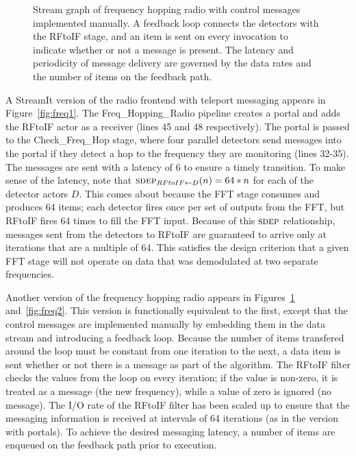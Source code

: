 \begin{figure}[t]
\vspace{-12pt}
\vspace{-20pt}
\caption{\small Stream graph of frequency hopping radio with control
messages implemented manually.  A feedback loop connects the detectors
with the RFtoIF stage, and an item is sent on every invocation to
indicate whether or not a message is present.  The latency and
periodicity of message delivery are governed by the data rates and the
number of items on the feedback
path. \protect\label{fig:fhr-manual}}
\vspace{-12pt}
\end{figure}

A StreamIt version of the radio frontend with teleport messaging
appears in Figure~\ref{fig:freq1}.  The Freq\_Hopping\_Radio pipeline
creates a portal and adds the RFtoIF actor as a receiver (lines 45 and
48 respectively).  The portal is passed to the Check\_Freq\_Hop stage,
where four parallel detectors send messages into the portal if they
detect a hop to the frequency they are monitoring (lines 32-35).  The
messages are sent with a latency of 6 to ensure a timely transition.
To make sense of the latency, note that $\sdepf{RFtoIF}{D}(n) = 64*n$
for each of the detector actors $D$.  This comes about because the FFT
stage consumes and produces 64 items; each detector fires once per set
of outputs from the FFT, but RFtoIF fires 64 times to fill the FFT
input.  Because of this $\textsc{sdep}$ relationship, messages sent from the
detectors to RFtoIF are guaranteed to arrive only at iterations that
are a multiple of 64.  This satisfies the design criterion that a
given FFT stage will not operate on data that was demodulated at two
separate frequencies.

Another version of the frequency hopping radio appears in
Figures~\ref{fig:fhr-manual} and~\ref{fig:freq2}.  This version is
functionally equivalent to the first, except that the control messages
are implemented manually by embedding them in the data stream and
introducing a feedback loop.  Because the number of items transfered
around the loop must be constant from one iteration to the next, a
data item is sent whether or not there is a message as part of the
algorithm.  The RFtoIF filter checks the values from the loop on every
iteration; if the value is non-zero, it is treated as a message (the
new frequency), while a value of zero is ignored (no message).  The
I/O rate of the RFtoIF filter has been scaled up to ensure that the
messaging information is received at intervals of 64 iterations (as in
the version with portals).  To achieve the desired messaging latency,
a number of items are enqueued on the feedback path prior to
execution.

